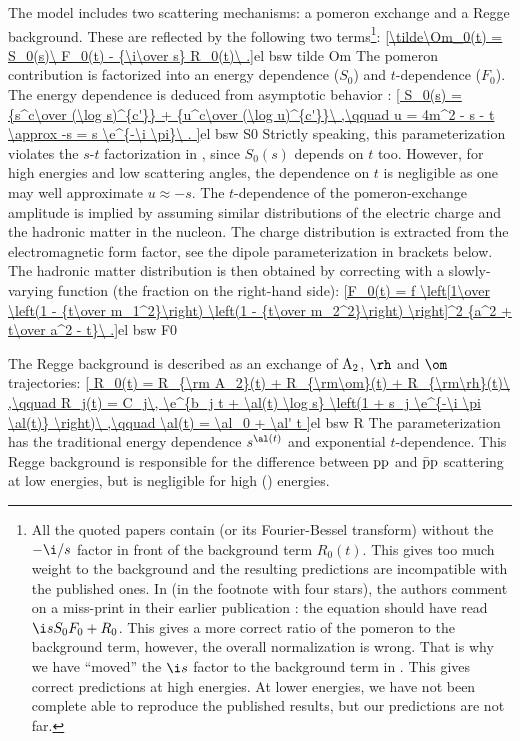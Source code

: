 The model includes two scattering mechanisms: a pomeron exchange and a Regge background. These are reflected by the following two terms\footnote{%
All the quoted papers contain  (or its Fourier-Bessel transform) without the $-\i/s$ factor in front of the background term $R_0(t)$. This gives too much weight to the background and the resulting predictions are incompatible with the published ones. In  (in the footnote with four stars), the authors comment on a miss-print in their earlier publication : the equation should have read $\i s S_0 F_0 + R_0$. This gives a more correct ratio of the pomeron to the background term, however, the overall normalization is wrong. That is why we have ``moved'' the $\i s$ factor to the background term in . This gives correct predictions at high energies. At lower energies, we have not been complete able to reproduce the published results, but our predictions are not far.
}:
\eqref{\tilde\Om_0(t) = S_0(s)\ F_0(t) - {\i\over s} R_0(t)\ .}{el bsw tilde Om}
The pomeron contribution is factorized into an energy dependence ($S_0$) and $t$-dependence ($F_0$). The energy dependence is deduced from asymptotic  behavior :
\eqref{
	S_0(s) = {s^c\over (\log s)^{c'}} + {u^c\over (\log u)^{c'}}\ ,\qquad
	u = 4m^2 - s - t \approx -s = s \e^{-\i \pi}\ .
}{el bsw S0}
Strictly speaking, this parameterization violates the $s$-$t$ factorization in , since $S_0(s)$ depends on $t$ too. However, for high energies and low scattering angles, the dependence on $t$ is negligible as one may well approximate $u \approx -s$. The $t$-dependence of the pomeron-exchange amplitude is implied by assuming similar distributions of the electric charge and the hadronic matter in the nucleon. The charge distribution is extracted from the electromagnetic form factor, see the dipole parameterization in brackets below. The hadronic matter distribution is then obtained by correcting with a slowly-varying function (the fraction on the right-hand side):
\eqref{F_0(t) = f \left[1\over \left(1 - {t\over m_1^2}\right) \left(1 - {t\over m_2^2}\right) \right]^2 {a^2 + t\over a^2 - t}\ .}{el bsw F0}

The Regge background is described as an exchange of $\rm A_2$, $\rm \rh$ and $\rm \om$ trajectories:
\eqref{
	R_0(t) = R_{\rm A_2}(t) + R_{\rm\om}(t) + R_{\rm\rh}(t)\ ,\qquad
	R_j(t) = C_j\, \e^{b_j t + \al(t) \log s} \left(1 + s_j \e^{-\i \pi \al(t)} \right)\ ,\qquad
	\al(t) = \al_0 + \al' t
}{el bsw R}
The parameterization has the traditional energy dependence $s^{\al(t)}$ and exponential $t$-dependence. This Regge background is responsible for the difference between $\rm pp$ and $\rm\bar pp$ scattering at low energies, but is negligible for high () energies.

